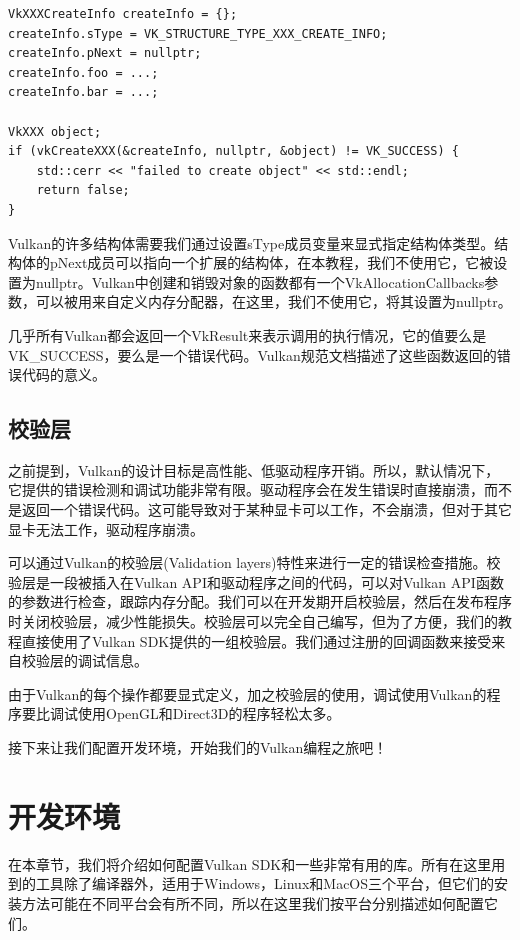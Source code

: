 \documentclass{ctexart}
\begin{document}
\begin{lstlisting}[language={[ANSI]C}]
VkXXXCreateInfo createInfo = {};
createInfo.sType = VK_STRUCTURE_TYPE_XXX_CREATE_INFO;
createInfo.pNext = nullptr;
createInfo.foo = ...;
createInfo.bar = ...;

VkXXX object;
if (vkCreateXXX(&createInfo, nullptr, &object) != VK_SUCCESS) {
	std::cerr << "failed to create object" << std::endl;
	return false;
}
\end{lstlisting}

Vulkan的许多结构体需要我们通过设置sType成员变量来显式指定结构体类型。结构体的pNext成员可以指向一个扩展的结构体，在本教程，我们不使用它，它被设置为nullptr。Vulkan中创建和销毁对象的函数都有一个VkAllocationCallbacks参数，可以被用来自定义内存分配器，在这里，我们不使用它，将其设置为nullptr。

几乎所有Vulkan都会返回一个VkResult来表示调用的执行情况，它的值要么是VK\_SUCCESS，要么是一个错误代码。Vulkan规范文档描述了这些函数返回的错误代码的意义。

\subsection{校验层}

之前提到，Vulkan的设计目标是高性能、低驱动程序开销。所以，默认情况下，它提供的错误检测和调试功能非常有限。驱动程序会在发生错误时直接崩溃，而不是返回一个错误代码。这可能导致对于某种显卡可以工作，不会崩溃，但对于其它显卡无法工作，驱动程序崩溃。

可以通过Vulkan的校验层(Validation layers)特性来进行一定的错误检查措施。校验层是一段被插入在Vulkan API和驱动程序之间的代码，可以对Vulkan API函数的参数进行检查，跟踪内存分配。我们可以在开发期开启校验层，然后在发布程序时关闭校验层，减少性能损失。校验层可以完全自己编写，但为了方便，我们的教程直接使用了Vulkan SDK提供的一组校验层。我们通过注册的回调函数来接受来自校验层的调试信息。

由于Vulkan的每个操作都要显式定义，加之校验层的使用，调试使用Vulkan的程序要比调试使用OpenGL和Direct3D的程序轻松太多。

接下来让我们配置开发环境，开始我们的Vulkan编程之旅吧！

\newpage
\section{开发环境}

在本章节，我们将介绍如何配置Vulkan SDK和一些非常有用的库。所有在这里用到的工具除了编译器外，适用于Windows，Linux和MacOS三个平台，但它们的安装方法可能在不同平台会有所不同，所以在这里我们按平台分别描述如何配置它们。
\end{document}
